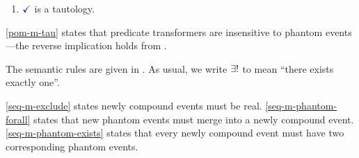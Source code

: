 \begin{definition}
\begin{enumerate}[,label=(\textsc{c}\arabic*),ref=\textsc{c}\arabic*]
      \setcounter{enumi}{\value{Bterm}}
    \item \label{top-term-c11}
      $\aTerm$ is a tautology.
    \end{enumerate}
\end{definition}

\ref{pom-m-tau} states that predicate transformers are insensitive to phantom
events---the reverse implication holds from .



The semantic rules are given in .  As usual, we write
$\exists!$ to mean ``there exists exactly one''.

\ref{seq-m-exclude} states newly compound events must be real.
\ref{seq-m-phantom-forall} states that new phantom events must merge into a
newly compound event.
\ref{seq-m-phantom-exists} states that every newly compound event must have two
corresponding phantom events.



